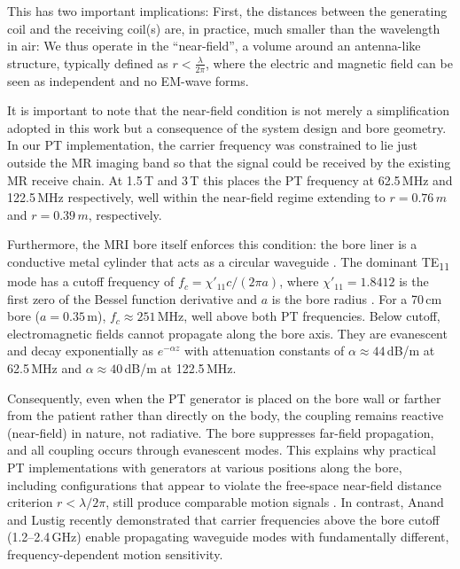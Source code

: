 \documentclass[
]{article}
\begin{document}
This has two important implications: First, the distances between the
generating coil and the receiving coil(s) are, in practice, much smaller than the wavelength in air: We thus operate in the ``near-field'', a volume
around an antenna-like structure, typically defined as
$r < \frac{\lambda}{2\pi}$, where the electric and magnetic field can
be seen as independent and no EM-wave forms. 

It is important to note that the near-field condition is not merely a simplification adopted in this work but a consequence of the system design and bore geometry. In our PT implementation, the carrier frequency was constrained to lie just outside the MR imaging band so that the signal could be received by the existing MR receive chain. At 1.5\,T and 3\,T this places the PT frequency at 62.5\,MHz and 122.5\,MHz respectively, well within the near-field regime extending to $r=0.76\,m$ and $r=0.39\,m$, respectively.

Furthermore, the MRI bore itself enforces this condition: the bore liner is a conductive metal cylinder that acts as a circular waveguide \cite{Brunner2009TravellingWave, Tang2011CutoffFree}. The dominant TE\textsubscript{11} mode has a cutoff frequency of $f_c = \chi'_{11} c / (2\pi a)$, where $\chi'_{11} = 1.8412$ is the first zero of the Bessel function derivative and $a$ is the bore radius \cite{Pozar2012Microwave}. For a 70\,cm bore ($a = 0.35$\,m), $f_c \approx 251$\,MHz, well above both PT frequencies. Below cutoff, electromagnetic fields cannot propagate along the bore axis. They are evanescent and decay exponentially as $e^{-\alpha z}$ with attenuation constants of $\alpha \approx 44$\,dB/m at 62.5\,MHz and $\alpha \approx 40$\,dB/m at 122.5\,MHz.

Consequently, even when the PT generator is placed on the bore wall or farther from the patient rather than directly on the body, the coupling remains reactive (near-field) in nature, not radiative. The bore suppresses far-field propagation, and all coupling occurs through evanescent modes. This explains why practical PT implementations with generators at various positions along the bore, including configurations that appear to violate the free-space near-field distance criterion $r < \lambda / 2\pi$, still produce comparable motion signals \cite{Vahle2020RespiratoryTone, Rigie2018TrackingNavigation}. In contrast, Anand and Lustig \cite{Anand2024BeatFrequencies} recently demonstrated that carrier frequencies above the bore cutoff (1.2--2.4\,GHz) enable propagating waveguide modes with fundamentally different, frequency-dependent motion sensitivity.
\end{document}
